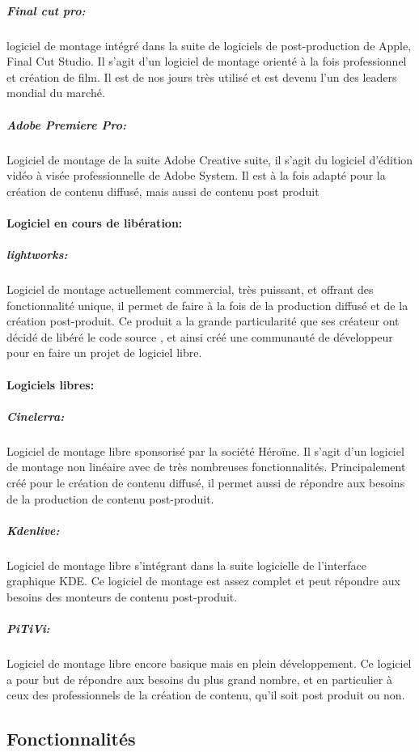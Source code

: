 \subparagraph{Final cut pro:}
logiciel de montage intégré dans la suite de logiciels de post-production
de Apple, Final Cut Studio. Il s'agit d'un logiciel de montage orienté à la fois
professionnel et création de film. Il est de nos jours très utilisé et est devenu l'un
des leaders mondial du marché.

\subparagraph{Adobe Premiere Pro:}
Logiciel de montage de la suite Adobe Creative suite, il s'agit du logiciel
d'édition vidéo à visée professionnelle de Adobe System. Il est à la fois adapté pour la création
de contenu diffusé, mais aussi de contenu post produit

\paragraph {Logiciel en cours de libération:}

\subparagraph{lightworks:}
Logiciel de montage actuellement commercial, très puissant, et offrant des fonctionnalité unique,
il permet de faire à la fois de la production diffusé et de la création post-produit. Ce produit
a la grande particularité que ses créateur ont décidé de libéré le code source
\cite{TheLightworksOpenSourceProjectStartHere}, et ainsi créé une communauté de développeur pour
en faire un projet de logiciel libre.

\paragraph {Logiciels libres:}

\subparagraph{Cinelerra:}
Logiciel de montage libre sponsorisé par la société Héroïne. Il s'agit d'un logiciel
de montage non linéaire avec de très nombreuses fonctionnalités. Principalement créé pour le création de contenu
diffusé, il permet aussi de répondre aux besoins de la production de contenu post-produit.

\subparagraph{Kdenlive:}
Logiciel de montage libre s'intégrant dans la suite logicielle de l'interface graphique KDE.
Ce logiciel de montage est assez complet et peut répondre aux besoins des monteurs de contenu post-produit.

\subparagraph{PiTiVi:}
Logiciel de montage libre encore basique mais en plein développement.
Ce logiciel a pour but de répondre aux besoins du plus grand nombre,
et en particulier à ceux des professionnels de la création de contenu,
qu'il soit post produit ou non.


\subsection{Fonctionnalités}
